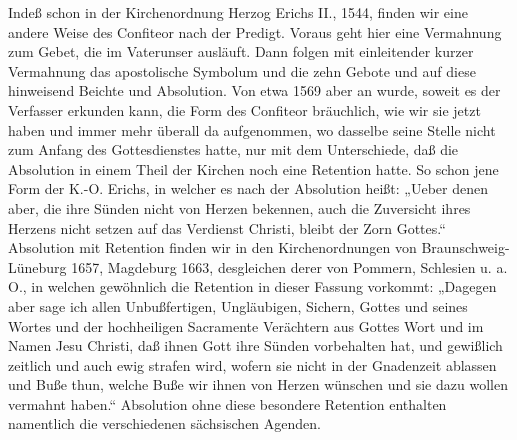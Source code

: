 Indeß schon in der Kirchenordnung Herzog Erichs II., 1544, finden wir eine andere Weise des Confiteor nach der Predigt. Voraus geht hier eine Vermahnung zum Gebet, die im Vaterunser ausläuft. Dann folgen mit einleitender kurzer Vermahnung das apostolische Symbolum und die zehn Gebote und auf diese hinweisend Beichte und Absolution. Von etwa 1569 aber an wurde, soweit es der Verfasser erkunden kann, die Form des Confiteor bräuchlich, wie wir sie jetzt haben und immer mehr überall da aufgenommen, wo dasselbe seine Stelle nicht zum Anfang des Gottesdienstes hatte, nur mit dem Unterschiede, daß die Absolution in einem Theil der Kirchen noch eine Retention hatte. So schon jene Form der K.-O. Erichs, in welcher es nach der Absolution heißt: „Ueber denen aber, die ihre Sünden nicht von Herzen bekennen, auch die Zuversicht ihres Herzens nicht setzen auf das Verdienst Christi, bleibt der Zorn Gottes.“ Absolution mit Retention finden wir in den Kirchenordnungen von Braunschweig-Lüneburg 1657, Magdeburg 1663, desgleichen derer von Pommern, Schlesien u. a. O., in welchen gewöhnlich die Retention in dieser Fassung vorkommt: „Dagegen aber sage ich allen Unbußfertigen, Ungläubigen, Sichern, Gottes und seines Wortes und der hochheiligen Sacramente Verächtern aus Gottes Wort und im Namen Jesu Christi, daß ihnen Gott ihre Sünden vorbehalten hat, und gewißlich zeitlich und auch ewig strafen wird, wofern sie nicht in der Gnadenzeit ablassen und Buße thun, welche Buße wir ihnen von Herzen wünschen und sie dazu wollen vermahnt haben.“ Absolution ohne diese besondere Retention enthalten namentlich die verschiedenen sächsischen Agenden.


